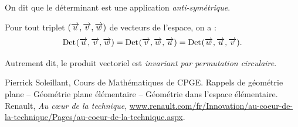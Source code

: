 \documentclass[10pt,oneside]{article}
\newcommand{\Det}{\mathrm{Det}\hspace{.2mm}}
\begin{document}
\begin{rem}

On dit que le déterminant est une application \emph{anti-symétrique}.
\end{rem}

\begin{coro}
Pour tout triplet $(\overrightarrow{u}, \overrightarrow{v}, \overrightarrow{w})$ de vecteurs de l'espace, on a :
$$\Det(\vect{u},\vect{v}, \vect{w})=\Det(\vect{v},\vect{w}, \vect{u})=\Det(\vect{w},\vect{u}, \vect{v}).$$

Autrement dit, le produit vectoriel est \emph{invariant par permutation circulaire}.\\
\end{coro}




\begin{thebibliography}{2}
 Pierrick Soleillant, Cours de Mathématiques de CPGE. Rappels de géométrie plane -- Géométrie plane élémentaire -- Géométrie dans l'espace élémentaire.
    Renault, \textit{Au c\oe{}ur de la technique}, \url{www.renault.com/fr/Innovation/au-coeur-de-la-technique/Pages/au-coeur-de-la-technique.aspx}.
\end{thebibliography}
\end{document}
